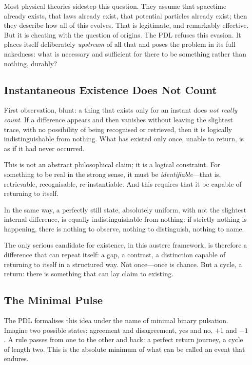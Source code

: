 \documentclass[12pt, a4paper, openright]{book}
\begin{document}
\medskip

Most physical theories sidestep this question. They assume that spacetime already exists, that laws already exist, that potential particles already exist; then they describe how all of this evolves. That is legitimate, and remarkably effective. But it is cheating with the question of origins. The PDL refuses this evasion. It places itself deliberately \emph{upstream} of all that and poses the problem in its full nakedness: what is necessary and sufficient for there to be something rather than nothing, durably?

\subsection*{Instantaneous Existence Does Not Count}

First observation, blunt: a thing that exists only for an instant does \emph{not really count}. If a difference appears and then vanishes without leaving the slightest trace, with no possibility of being recognised or retrieved, then it is logically indistinguishable from nothing. What has existed only once, unable to return, is as if it had never occurred.

\medskip

This is not an abstract philosophical claim; it is a logical constraint. For something to be real in the strong sense, it must be \emph{identifiable}---that is, retrievable, recognisable, re-instantiable. And this requires that it be capable of returning to itself.

\medskip

In the same way, a perfectly still state, absolutely uniform, with not the slightest internal difference, is equally indistinguishable from nothing: if strictly nothing is happening, there is nothing to observe, nothing to distinguish, nothing to name.

\medskip

The only serious candidate for existence, in this austere framework, is therefore a difference that can repeat itself: a gap, a contrast, a distinction capable of returning to itself in a structured way. Not once---once is chance. But a cycle, a return: there is something that can lay claim to existing.

\subsection*{The Minimal Pulse}

The PDL formalises this idea under the name of minimal binary pulsation. Imagine two possible states: agreement and disagreement, yes and no, $+1$ and $-1$. A rule passes from one to the other and back: a perfect return journey, a cycle of length two. This is the absolute minimum of what can be called an event that endures.
\end{document}
